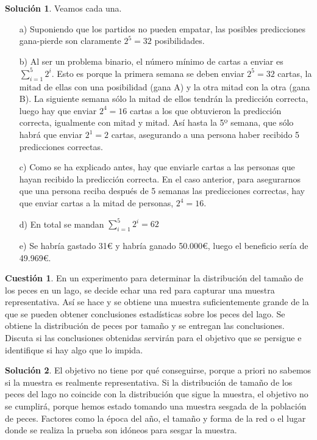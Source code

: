 \documentclass[a4paper, 11pt]{article}
\theoremstyle{definition}
\newtheorem{cuestion}{Cuestión}
\newtheorem*{solucion}{Solución}
\begin{document}
  \begin{solucion}
    Veamos cada una.

    \begin{enumerate}
      \item[a)] Suponiendo que los partidos no pueden empatar, las posibles predicciones gana-pierde son claramente $2^5=32$ posibilidades.
      \item[b)] Al ser un problema binario, el número mínimo de cartas a enviar es $\sum_{i=1}^5 2^i$. Esto es porque la primera semana se deben enviar $2^5=32$ cartas, la mitad de ellas con una posibilidad (gana A) y la otra mitad con la otra (gana B). La siguiente semana sólo la mitad de ellos tendrán la predicción correcta, luego hay que enviar $2^4=16$ cartas a los que obtuvieron la predicción correcta, igualmente con mitad y mitad. Así hasta la 5º semana, que sólo habrá que enviar $2^1=2$ cartas, asegurando a una persona haber recibido 5 predicciones correctas.
      \item[c)] Como se ha explicado antes, hay que enviarle cartas a las personas que hayan recibido la predicción correcta. En el caso anterior, para asegurarnos que una persona reciba después de 5 semanas las predicciones correctas, hay que enviar cartas a la mitad de personas, $2^4=16$.
      \item[d)] En total se mandan $\sum_{i=1}^5 2^i = 62$
      \item[e)] Se habría gastado 31\euro{} y habría ganado 50.000\euro{}, luego el beneficio sería de 49.969\euro{}.
    \end{enumerate}
  \end{solucion}

  \begin{cuestion}
    En un experimento para determinar la distribución del tamaño de los peces en un lago, se decide echar una red para capturar una muestra representativa. Así se hace y se obtiene una muestra suficientemente grande de la que se pueden obtener conclusiones estadísticas sobre los peces del lago. Se obtiene la distribución de peces por tamaño y se entregan las conclusiones. Discuta si las conclusiones obtenidas servirán para el objetivo que se persigue e identifique si hay algo que lo impida.
  \end{cuestion}

  \begin{solucion}
    El objetivo no tiene por qué conseguirse, porque a priori no sabemos si la muestra es realmente representativa. Si la distribución de tamaño de los peces del lago no coincide con la distribución que sigue la muestra, el objetivo no se cumplirá, porque hemos estado tomando una muestra sesgada de la población de peces. Factores como la época del año, el tamaño y forma de la red o el lugar donde se realiza la prueba son idóneos para sesgar la muestra.
  \end{solucion}
\end{document}
